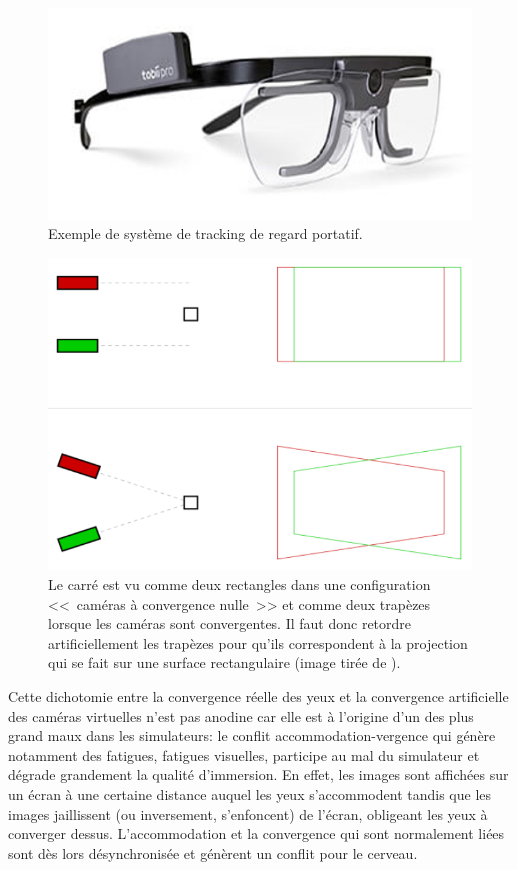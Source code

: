 	\begin{figure}
		\centering
		\includegraphics[scale=1]{Figures/EyeTrackerTobii}
		\caption{Exemple de système de tracking de regard portatif.}
		\label{fig:eye_tracker}
	\end{figure}
	
	\begin{figure}
		\centering
		\includegraphics[scale=.75]{Figures/RedressementPlansVision}
		\caption{Le carré est vu comme deux rectangles dans une configuration <<~caméras à convergence nulle~>> et comme deux trapèzes lorsque les caméras sont convergentes. Il faut donc retordre artificiellement les trapèzes pour qu'ils correspondent à la projection qui se fait sur une surface rectangulaire (image tirée de \citep{aurat_immersion_2016}).}
		\label{fig:redressement_plan_vision}
	\end{figure}
	
	\par Cette dichotomie entre la convergence réelle des yeux et la convergence artificielle des caméras virtuelles n'est pas anodine car elle est à l'origine d'un des plus grand maux dans les simulateurs: le conflit accommodation-vergence qui génère notamment des fatigues, fatigues visuelles, participe au mal du simulateur et dégrade grandement la qualité d'immersion. En effet, les images sont affichées sur un écran à une certaine distance auquel les yeux s'accommodent tandis que les images jaillissent (ou inversement, s'enfoncent) de l'écran, obligeant les yeux à converger dessus. L'accommodation et la convergence qui sont normalement liées sont dès lors désynchronisée et génèrent un conflit pour le cerveau.
	
